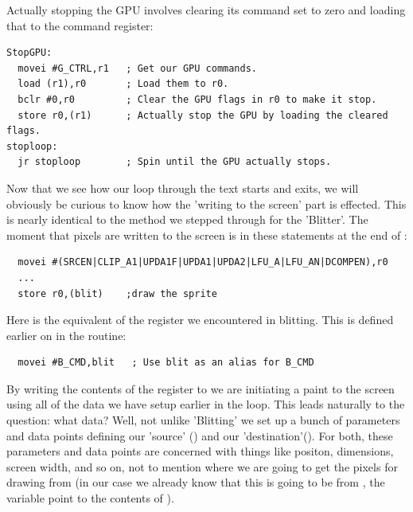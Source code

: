 Actually stopping the GPU involves clearing its command set to zero and loading that to the command register:
\begin{lstlisting}
StopGPU:
  movei #G_CTRL,r1   ; Get our GPU commands.
  load (r1),r0       ; Load them to r0.
  bclr #0,r0         ; Clear the GPU flags in r0 to make it stop.
  store r0,(r1)      ; Actually stop the GPU by loading the cleared flags.
stoploop:
  jr stoploop        ; Spin until the GPU actually stops.
\end{lstlisting}

Now that we see how our loop through the text starts and exits, we will obviously be curious to know how the 'writing
to the screen' part is effected. This is nearly identical to the method we stepped through for the 'Blitter'. The moment
that pixels are written to the screen is in these statements at the end of :

\begin{lstlisting}
  movei #(SRCEN|CLIP_A1|UPDA1F|UPDA1|UPDA2|LFU_A|LFU_AN|DCOMPEN),r0
  ...
  store r0,(blit)    ;draw the sprite
\end{lstlisting}

Here  is the equivalent of the  register we encountered in blitting. This is defined earlier on in the routine:
\begin{lstlisting}
  movei #B_CMD,blit   ; Use blit as an alias for B_CMD
\end{lstlisting}

By writing the contents of the
 register to  we are initiating a paint to the screen using all of the data we have setup earlier in the loop. This leads
naturally to the question: what data? Well, not unlike 'Blitting' we set up a bunch of parameters and data points defining our 'source' () and
our 'destination'(). For both, these parameters and data points are concerned with things like positon, dimensions, screen width, and so on, not
to mention where we are going to get the pixels for drawing from (in our case we already know that this is going to be from , the variable
point to the contents of ).

